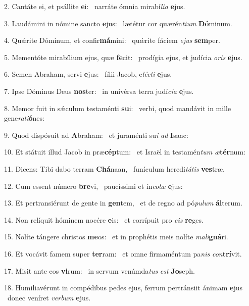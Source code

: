 2. Cantáte ei, et psállite \textbf{e}i: \ast\  narráte ómnia mirabí\textit{li}\textit{a} \textbf{e}jus.\

3. Laudámini in nómine sancto \textbf{e}jus: \ast\  lætétur cor quærén\textit{ti}\textit{um} \textbf{Dó}minum.\

4. Quǽrite Dóminum, et confir\textbf{má}mini: \ast\  quǽrite fáciem \textit{e}\textit{jus} \textbf{sem}per.\

5. Mementóte mirabílium ejus, quæ \textbf{fe}cit: \ast\  prodígia ejus, et judícia \textit{o}\textit{ris} \textbf{e}jus.\

6. Semen Abraham, servi \textbf{e}jus: \ast\  fílii Jacob, e\textit{léc}\textit{ti} \textbf{e}jus.\

7. Ipse Dóminus Deus \textbf{nos}ter: \ast\  in univérsa terra judí\textit{ci}\textit{a} \textbf{e}jus.\

8. Memor fuit in sǽculum testaménti \textbf{su}i: \ast\  verbi, quod mandávit in mille gene\textit{ra}\textit{ti}\textbf{ó}nes:\

9. Quod dispósuit ad \textbf{A}braham: \ast\  et juraménti su\textit{i} \textit{ad} \textbf{I}saac:\

10. Et státuit illud Jacob in præ\textbf{cép}tum: \ast\  et Israël in testamén\textit{tum} \textit{æ}\textbf{tér}num:\

11. Dicens: Tibi dabo terram \textbf{Chá}naan, \ast\  funículum heredi\textit{tá}\textit{tis} \textbf{ves}træ.\

12. Cum essent número \textbf{bre}vi, \ast\  paucíssimi et ín\textit{co}\textit{læ} \textbf{e}jus:\

13. Et pertransiérunt de gente in \textbf{gen}tem, \ast\  et de regno ad pó\textit{pu}\textit{lum} \textbf{ál}terum.\

14. Non relíquit hóminem nocére \textbf{e}is: \ast\  et corrípuit pro \textit{e}\textit{is} \textbf{re}ges.\

15. Nolíte tángere christos \textbf{me}os: \ast\  et in prophétis meis nolíte \textit{ma}\textit{li}\textbf{gná}ri.\

16. Et vocávit famem super \textbf{ter}ram: \ast\  et omne firmaméntum pa\textit{nis} \textit{con}\textbf{trí}vit.\

17. Misit ante eos \textbf{vi}rum: \ast\  in servum venúmda\textit{tus} \textit{est} \textbf{Jo}seph.\

18. Humiliavérunt in compédibus pedes ejus, ferrum pertránsiit ánimam \textbf{e}jus \ast\  donec veníret \textit{ver}\textit{bum} \textbf{e}jus.\

